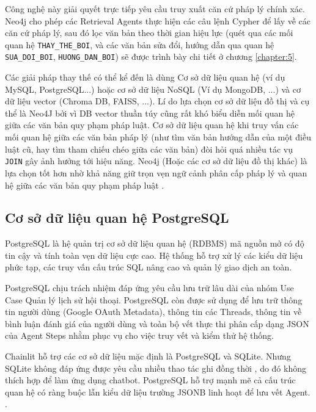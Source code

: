 \documentclass[../DoAn.tex]{subfiles}
\begin{document}
Công nghệ này giải quyết trực tiếp yêu cầu truy xuất căn cứ pháp lý chính xác. Neo4j cho phép các Retrieval Agents thực hiện các câu lệnh Cypher để lấy về các căn cứ pháp lý, sau đó lọc văn bản theo thời gian hiệu lực (quét qua các mối quan hệ \texttt{THAY\_THE\_BOI}, và các văn bản sửa đổi, hướng dẫn qua quan hệ \texttt{SUA\_DOI\_BOI}, \texttt{HUONG\_DAN\_BOI}) sẽ được trình bày chi tiết ở chương \ref{chapter:5}.


Các giải pháp thay thế có thể kể đến là dùng Cơ sở dữ liệu quan hệ (ví dụ MySQL, PostgreSQL...) hoặc cơ sở dữ liệu NoSQL (Ví dụ MongoDB, ...) và cơ dữ liệu vector (Chroma DB, FAISS, ...). Lí do lựa chọn cơ sở dữ liệu đồ thị và cụ thể là Neo4J bởi vì DB vector thuần túy cũng rất khó biểu diễn mối quan hệ giữa các văn bản quy phạm pháp luật. Cơ sở dữ liệu quan hệ khi truy vấn các mối quan hệ giữa các văn bản pháp lý (như tìm văn bản hướng dẫn của một điều luật cũ, hay tìm tham chiếu chéo giữa các văn bản) đòi hỏi quá nhiều tác vụ \texttt{JOIN}  gây ảnh hưởng tới hiệu năng. Neo4j (Hoặc các cơ sở dữ liệu đồ thị khác) là lựa chọn tốt hơn nhờ khả năng giữ trọn vẹn ngữ cảnh phân cấp pháp lý và quan hệ giữa các văn bản quy phạm pháp luật \cite{9631310}.


\subsection{Cơ sở dữ liệu quan hệ PostgreSQL}
\label{subsection:3.2.2}


PostgreSQL \cite{PostgreSQLDoc} là hệ quản trị cơ sở dữ liệu quan hệ (RDBMS) mã nguồn mở có độ tin cậy và tính toàn vẹn dữ liệu cực cao. Hệ thống hỗ trợ xử lý các kiểu dữ liệu phức tạp, các truy vấn cấu trúc SQL nâng cao và quản lý giao dịch an toàn.


PostgreSQL chịu trách nhiệm đáp ứng yêu cầu lưu trữ lâu dài của nhóm Use Case Quản lý lịch sử hội thoại. PostgreSQL còn được sử dụng để lưu trữ thông tin người dùng (Google OAuth Metadata), thông tin các Threads, thông tin về bình luận đánh giá của người dùng và toàn bộ vết thực thi phân cấp dạng JSON của Agent Steps nhằm phục vụ cho việc truy vết và kiểm thử hệ thống.


Chainlit hỗ trợ các cơ sở dữ liệu mặc định là PostgreSQL và SQLite. Nhưng SQLite không đáp ứng được yêu cầu nhiều thao tác ghi đồng thời \cite{SQLiteDoc}, do đó không thích hợp để làm ứng dụng chatbot. PostgreSQL hỗ trợ mạnh mẽ cả cấu trúc quan hệ có ràng buộc lẫn kiểu dữ liệu trường JSONB linh hoạt để lưu vết Agent. \cite{ChainlitDoc}.
\end{document}
